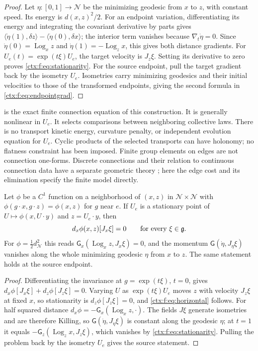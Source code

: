 \begin{proof}
Let $\eta:[0,1]\to\mathcal N$ be the minimizing geodesic from $x$ to $z$, with constant speed. Its energy is $d(x,z)^2/2$. For an endpoint variation, differentiating its energy and integrating the covariant derivative by parts gives
$\langle\dot\eta(1),\delta z\rangle-\langle\dot\eta(0),\delta x\rangle$;
the interior term vanishes because $\nabla_t\dot\eta=0$. Since
$\dot\eta(0)=\operatorname{Log}_xz$ and $\dot\eta(1)=-\operatorname{Log}_zx$, this gives both distance gradients. For $U_e(t)=\exp(t\xi)U_e$, the target velocity is $J_z\xi$. Setting its derivative to zero proves \cref{ctx:f:eq:stationarity}. For the source endpoint, pull the target gradient back by the isometry $U_e$. Isometries carry minimizing geodesics and their initial velocities to those of the transformed endpoints, giving the second formula in \cref{ctx:f:eq:endpointgrad}.
\end{proof}

 is the exact finite connection equation of this construction. It is generally nonlinear in $U_e$. It selects comparisons between neighboring collective laws. There is no transport kinetic energy, curvature penalty, or independent evolution equation for $U_e$. Cyclic products of the selected transports can have holonomy; no flatness constraint has been imposed. Finite group elements on edges are not connection one-forms. Discrete connections and their relation to continuous connection data have a separate geometric theory \cite{LeokMarsdenWeinstein2005}; here the edge cost and its elimination specify the finite model directly.

Let $\phi$ be a $C^1$ function on a neighborhood of $(x,z)$ in $\mathcal N\times\mathcal N$ with $\phi(g\cdot x,g\cdot z)=\phi(x,z)$ for $g$ near $e$. If $U_e$ is a stationary point of $U\mapsto\phi(x,U\cdot y)$ and $z=U_e\cdot y$, then
\begin{equation}
 d_x\phi(x,z)[J_x\xi]=0\qquad\hbox{for every }\xi\in\mathfrak g.
 \label{ctx:f:eq:horizontal}
\end{equation}
For $\phi=\tfrac12d_{\mathcal N}^2$ this reads $\mathsf G_x(\operatorname{Log}_x z,J_x\xi)=0$, and the momentum $\mathsf G(\dot\eta,J_\eta\xi)$ vanishes along the whole minimizing geodesic $\eta$ from $x$ to $z$. The same statement holds at the source endpoint.

\begin{proof}
Differentiating the invariance at $g=\exp(t\xi)$, $t=0$, gives $d_x\phi[J_x\xi]+d_z\phi[J_z\xi]=0$. Varying $U$ as $\exp(t\xi)U_e$ moves $z$ with velocity $J_z\xi$ at fixed $x$, so stationarity is $d_z\phi[J_z\xi]=0$, and \cref{ctx:f:eq:horizontal} follows. For half squared distance $d_x\phi=-\mathsf G_x(\operatorname{Log}_xz,\cdot)$. The fields $J\xi$ generate isometries and are therefore Killing, so $\mathsf G(\dot\eta,J_\eta\xi)$ is constant along the geodesic $\eta$; at $t=1$ it equals $-\mathsf G_z(\operatorname{Log}_zx,J_z\xi)$, which vanishes by \cref{ctx:f:eq:stationarity}. Pulling the problem back by the isometry $U_e$ gives the source statement.
\end{proof}

